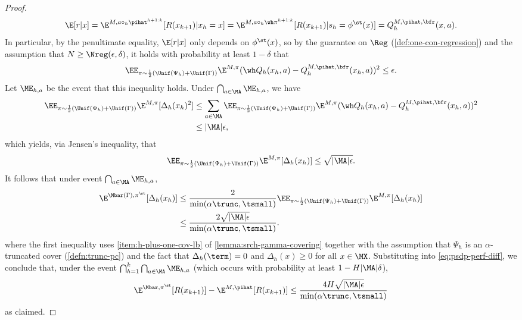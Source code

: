 \begin{proof}
  \[\E[r|x] = \E^{M,a \circ_h \pihat^{h+1:k}}[R(x_{k+1}) | x_h = x] = \E^{M,a \circ_h \wh \pi^{h+1:k}}[R(x_{k+1})|s_h = \phi^\st(x)] = Q^{M,\pihat,\bfr}_h(x,a).\]
  In particular, by the penultimate equality, $\E[r|x]$ only depends on $\phi^\st(x)$, so by the guarantee on $\Reg$ (\cref{def:one-con-regression}) and the assumption that $N \geq \Nreg(\epsilon,\delta)$, it holds with probability at least $1-\delta$ that
  \[\EE_{\pi \sim \frac{1}{2}(\Unif(\Psi_h)+\Unif(\Gamma))} \E^{M,\pi}(\wh Q_h(x_h,a) - Q^{M,\pihat,\bfr}_h(x_h,a))^2 \leq \epsilon.\]
  Let $\ME_{h,a}$ be the event that this inequality holds. Under $\bigcap_{a \in \MA} \ME_{h,a}$, we have
  \begin{align*}
\EE_{\pi \sim \frac{1}{2}(\Unif(\Psi_h)+\Unif(\Gamma))} \E^{M,\pi}[\Delta_h(x_h)^2] 
&\leq \sum_{a\in\MA} \EE_{\pi \sim \frac{1}{2}(\Unif(\Psi_h)+\Unif(\Gamma))} \E^{M,\pi}(\wh Q_h(x_h,a) - Q^{M,\pihat,\bfr}_h(x_h,a))^2 \\ 
&\leq |\MA|\epsilon,
\end{align*}
  which yields, via Jensen's inequality, that
  \[\EE_{\pi \sim \frac{1}{2}(\Unif(\Psi_h)+\Unif(\Gamma))} \E^{M,\pi}[\Delta_h(x_h)] \leq \sqrt{|\MA|\epsilon}.\] It follows that under event $\bigcap_{a\in\MA} \ME_{h,a}$,
  \begin{align}
    \E^{\Mbar(\Gamma),\pi^\st}[\Delta_h(x_h)] 
    &\leq \frac{2}{\min(\alpha\trunc,\tsmall)} \EE_{\pi\sim\frac{1}{2}(\Unif(\Psi_h)+\Unif(\Gamma))} \E^{M,\pi}[\Delta_h(x_h)] \nonumber \\ 
    &\leq \frac{2\sqrt{|\MA|\epsilon}}{\min(\alpha\trunc,\tsmall)} \nonumber.
  \end{align}
  where the first inequality uses \cref{item:h-plus-one-cov-lb} of \cref{lemma:srch-gamma-covering} together with the assumption that $\Psi_h$ is an $\alpha$-truncated cover (\cref{defn:trunc-pc}) and the fact that $\Delta_h(\term)=0$ and $\Delta_h(x) \geq 0$ for all $x \in \MX$.
Substituting into \cref{eq:psdp-perf-diff}, we conclude that, under the event $\bigcap_{h=1}^{k} \bigcap_{a\in\MA} \ME_{h,a}$ (which occurs with probability at least $1-H|\MA|\delta$), 
  \[
    \E^{\Mbar,\pi^\st}[R(x_{k+1})] - \E^{M,\pihat}[R(x_{k+1})] \leq \frac{4H\sqrt{|\MA|\epsilon}}{\min(\alpha\trunc,\tsmall)}
  \]
  as claimed.
\end{proof}

\iffalse 


